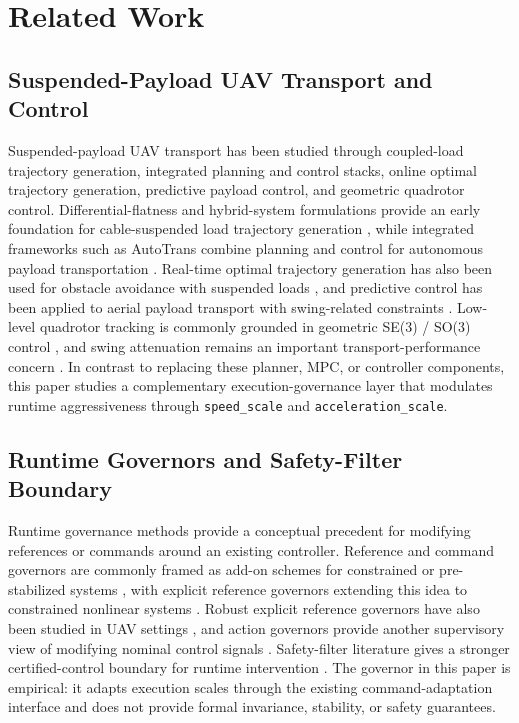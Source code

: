 \section{Related Work}

\subsection{Suspended-Payload UAV Transport and Control}

Suspended-payload UAV transport has been studied through coupled-load
trajectory generation, integrated planning and control stacks, online optimal
trajectory generation, predictive payload control, and geometric quadrotor
control. Differential-flatness and hybrid-system formulations provide an early
foundation for cable-suspended load trajectory generation
\cite{Sreenath2013DifferentiallyFlatHybrid}, while integrated frameworks such
as AutoTrans combine planning and control for autonomous payload transportation
\cite{Li2023AutoTrans}. Real-time optimal trajectory generation has also been
used for obstacle avoidance with suspended loads
\cite{Son2020ObstacleAvoidanceSuspendedLoad}, and predictive control has been
applied to aerial payload transport with swing-related constraints
\cite{UrbinaBrito2021PredictivePayloadTransport}. Low-level quadrotor tracking
is commonly grounded in geometric SE(3) / SO(3) control
\cite{Lee2010GeometricTrackingSE3}, and swing attenuation remains an important
transport-performance concern \cite{GuerreroSanchez2017SwingAttenuation}. In
contrast to replacing these planner, MPC, or controller components, this paper
studies a complementary execution-governance layer that modulates runtime
aggressiveness through \texttt{speed\_scale} and
\texttt{acceleration\_scale}.


\subsection{Runtime Governors and Safety-Filter Boundary}

Runtime governance methods provide a conceptual precedent for modifying
references or commands around an existing controller. Reference and command
governors are commonly framed as add-on schemes for constrained or
pre-stabilized systems \cite{Garone2017ReferenceCommandGovernorsSurvey}, with
explicit reference governors extending this idea to constrained nonlinear
systems \cite{Garone2016ExplicitReferenceGovernor}. Robust explicit reference
governors have also been studied in UAV settings \cite{Nicotra2016UAVRobustERG},
and action governors provide another supervisory view of modifying nominal
control signals \cite{Li2021ActionGovernor}. Safety-filter literature gives a
stronger certified-control boundary for runtime intervention
\cite{Hsu2024SafetyFilterUnifiedView}. The governor in this paper is empirical:
it adapts execution scales through the existing command-adaptation interface
and does not provide formal invariance, stability, or safety guarantees.

